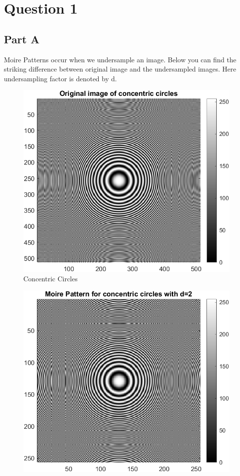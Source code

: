 \documentclass[12pt, a4paper]{article}
\begin{document}
\vspace*{-22pt}
\section*{Question 1}
\subsection*{Part A}
Moire Patterns occur when we undersample an image. Below you can find the striking difference between original image and the undersampled images. Here undersampling factor is denoted by d.

\begin{figure}[h!]
  \centering
    \includegraphics[scale=0.8]{ConcentricCircles_original.png}
    \caption{Concentric Circles}
  \label{fig:1}
\end{figure}

\begin{figure}[h!]
  \centering
    \includegraphics[scale=0.8]{moire2.png}
    \caption{}
  \label{fig:1}
\end{figure}
\end{document}
